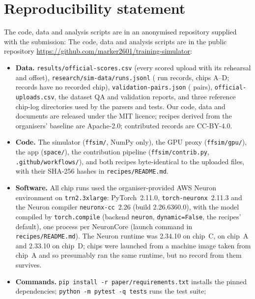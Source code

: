 \section*{Reproducibility statement}

\ifanonymous
The code, data and analysis scripts are in an anonymised repository supplied with the submission:
\else
The code, data and analysis scripts are in the public repository
\url{https://github.com/marker2601/training-simulator}:
\fi
\begin{itemize}
  \item \textbf{Data.} \texttt{results/official-scores.csv} (every scored upload with its rehearsal and offset),
    \texttt{research/sim-data/runs.jsonl} ( run records, chips A--D;  records have no
    recorded chip), \texttt{validation-pairs.json} ( pairs), \texttt{official-uploads.csv}, the
    dataset QA and validation reports, and three reference chip-log directories used by the parsers and tests. Our
    code, data and documents are released under the MIT licence; recipes derived from the organisers' baseline are
    Apache-2.0; contributed records are CC-BY-4.0.
  \item \textbf{Code.} The simulator (\texttt{ffsim/}, NumPy only), the GPU proxy (\texttt{ffsim/gpu/}), the app
    (\texttt{space/}), the contribution pipeline (\texttt{ffsim/contrib.py}, \texttt{.github/workflows/}), and both
    recipes byte-identical to the uploaded files, with their SHA-256 hashes in \texttt{recipes/README.md}.
  \item \textbf{Software.} All chip runs used the organiser-provided AWS Neuron environment on \texttt{trn2.3xlarge}:
    PyTorch~2.11.0, \texttt{torch-neuronx}~2.11.3 and the Neuron compiler \texttt{neuronx-cc}~2.26 (build
    2.26.6360.0), with the model compiled by \texttt{torch.compile} (backend \texttt{neuron},
    \texttt{dynamic=False}, the recipes' default), one process per NeuronCore (launch command in
    \texttt{recipes/README.md}). The Neuron runtime was 2.34.10 on chip~C, \docnum{} on chip~A
    and 2.33.10 on chip~D; chips \docnum{} were launched from a machine image taken from chip~A and
    so presumably ran the same runtime, but no record from them survives.
  \item \textbf{Commands.} \texttt{pip install -r paper/requirements.txt} installs the pinned dependencies; \texttt{python -m pytest -q tests} runs the test suite;

\end{itemize}
